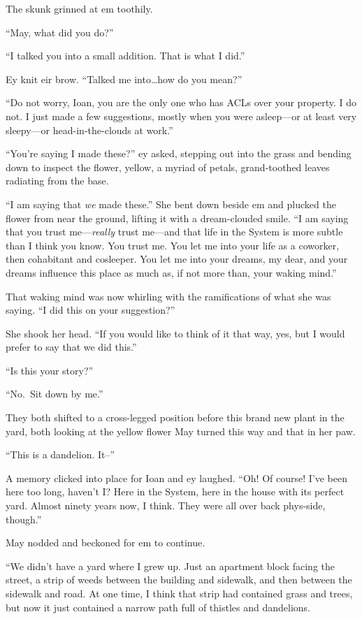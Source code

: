 The skunk grinned at em toothily.

``May, what did you do?''

``I talked you into a small addition. That is what I did.''

Ey knit eir brow. ``Talked me into\ldots how do you mean?''

``Do not worry, Ioan, you are the only one who has ACLs over your property. I do not. I just made a few suggestions, mostly when you were asleep---or at least very sleepy---or head-in-the-clouds at work.''

``You're saying I made these?'' ey asked, stepping out into the grass and bending down to inspect the flower, yellow, a myriad of petals, grand-toothed leaves radiating from the base.

``I am saying that \emph{we} made these.'' She bent down beside em and plucked the flower from near the ground, lifting it with a dream-clouded smile. ``I am saying that you trust me---\emph{really} trust me---and that life in the System is more subtle than I think you know. You trust me. You let me into your life as a coworker, then cohabitant and cosleeper. You let me into your dreams, my dear, and your dreams influence this place as much as, if not more than, your waking mind.''

That waking mind was now whirling with the ramifications of what she was saying. ``I did this on your suggestion?''

She shook her head. ``If you would like to think of it that way, yes, but I would prefer to say that we did this.''

``Is this your story?''

``No.~Sit down by me.''

They both shifted to a cross-legged position before this brand new plant in the yard, both looking at the yellow flower May turned this way and that in her paw.

``This is a dandelion. It--''

A memory clicked into place for Ioan and ey laughed. ``Oh! Of course! I've been here too long, haven't I? Here in the System, here in the house with its perfect yard. Almost ninety years now, I think. They were all over back phys-side, though.''

May nodded and beckoned for em to continue.

``We didn't have a yard where I grew up. Just an apartment block facing the street, a strip of weeds between the building and sidewalk, and then between the sidewalk and road. At one time, I think that strip had contained grass and trees, but now it just contained a narrow path full of thistles and dandelions.

